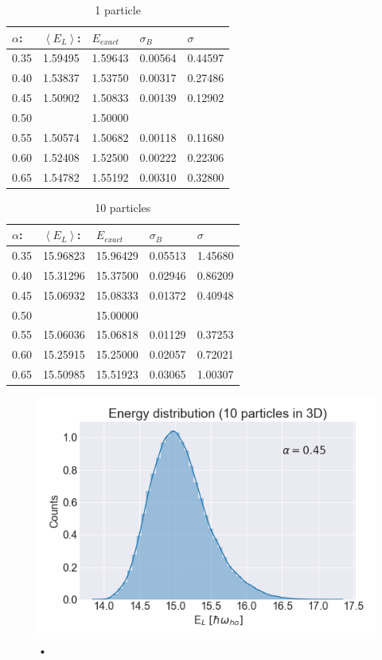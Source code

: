 \begin{table}[H]\caption{1 particle}\label{tab:brute_force_N_1}
\begin{tabular}{lllll}
$\alpha$: & $\left< E_L \right>$:& $E_{exact}$ & $\sigma_B$ & $\sigma$\\ \hline
0.35 & 1.59495 & 1.59643 & 0.00564 & 0.44597\\
0.40 & 1.53837 & 1.53750 & 0.00317 & 0.27486\\
0.45 & 1.50902 & 1.50833 & 0.00139 & 0.12902\\
0.50 &                & 1.50000 &                &                \\
0.55 & 1.50574 & 1.50682 & 0.00118 & 0.11680\\
0.60 & 1.52408 & 1.52500 & 0.00222 & 0.22306\\
0.65 & 1.54782 & 1.55192 & 0.00310 & 0.32800\\
\end{tabular}
\end{table} 

\begin{table}[H]\caption{10 particles}\label{tab:brute_force_N_10}
\begin{tabular}{lllll}
$\alpha$: & $\left< E_L \right>$:& $E_{exact}$ & $\sigma_B$ & $\sigma$\\ \hline
0.35 & 15.96823 & 15.96429 & 0.05513 & 1.45680\\
0.40 & 15.31296 & 15.37500 & 0.02946 & 0.86209\\
0.45 & 15.06932 & 15.08333 & 0.01372 & 0.40948\\
0.50 &                   & 15.00000 &                &                \\
0.55 & 15.06036 & 15.06818 & 0.01129 & 0.37253\\
0.60 & 15.25915 & 15.25000 & 0.02057 & 0.72021\\
0.65 & 15.50985 & 15.51923 & 0.03065 & 1.00307\\
\end{tabular}
\end{table} 

\begin{figure}[H]
\center
\includegraphics[width=0.5\linewidth]{../Results/histogram_10p_3d_alpha_45}\caption{•}\label{fig:histogram}
\end{figure}

